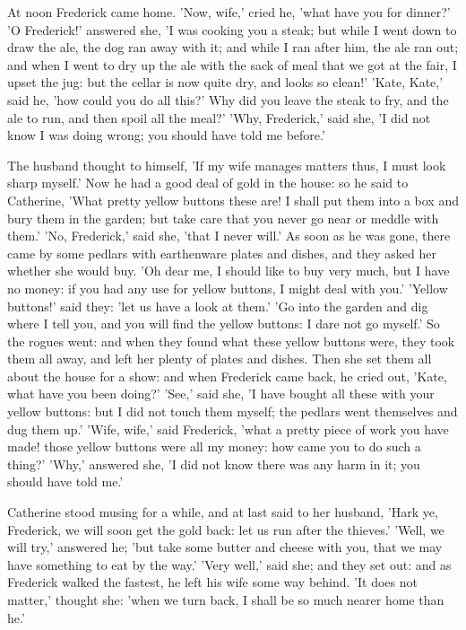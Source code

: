 \documentclass[12pt]{book}
\begin{document}
At noon Frederick came home. 'Now, wife,' cried he, 'what have you for
dinner?' 'O Frederick!' answered she, 'I was cooking you a steak; but
while I went down to draw the ale, the dog ran away with it; and while
I ran after him, the ale ran out; and when I went to dry up the ale
with the sack of meal that we got at the fair, I upset the jug: but
the cellar is now quite dry, and looks so clean!' 'Kate, Kate,' said
he, 'how could you do all this?' Why did you leave the steak to fry,
and the ale to run, and then spoil all the meal?' 'Why, Frederick,'
said she, 'I did not know I was doing wrong; you should have told me
before.'

The husband thought to himself, 'If my wife manages matters thus, I
must look sharp myself.' Now he had a good deal of gold in the house:
so he said to Catherine, 'What pretty yellow buttons these are! I
shall put them into a box and bury them in the garden; but take care
that you never go near or meddle with them.' 'No, Frederick,' said
she, 'that I never will.' As soon as he was gone, there came by some
pedlars with earthenware plates and dishes, and they asked her whether
she would buy. 'Oh dear me, I should like to buy very much, but I have
no money: if you had any use for yellow buttons, I might deal with
you.' 'Yellow buttons!' said they: 'let us have a look at them.' 'Go
into the garden and dig where I tell you, and you will find the yellow
buttons: I dare not go myself.' So the rogues went: and when they
found what these yellow buttons were, they took them all away, and
left her plenty of plates and dishes. Then she set them all about the
house for a show: and when Frederick came back, he cried out, 'Kate,
what have you been doing?' 'See,' said she, 'I have bought all these
with your yellow buttons: but I did not touch them myself; the pedlars
went themselves and dug them up.' 'Wife, wife,' said Frederick, 'what
a pretty piece of work you have made! those yellow buttons were all my
money: how came you to do such a thing?' 'Why,' answered she, 'I did
not know there was any harm in it; you should have told me.'

Catherine stood musing for a while, and at last said to her husband,
'Hark ye, Frederick, we will soon get the gold back: let us run after
the thieves.' 'Well, we will try,' answered he; 'but take some butter
and cheese with you, that we may have something to eat by the way.'
'Very well,' said she; and they set out: and as Frederick walked the
fastest, he left his wife some way behind. 'It does not matter,'
thought she: 'when we turn back, I shall be so much nearer home than
he.'
\end{document}
